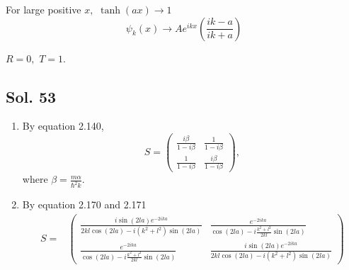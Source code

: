 \begin{enumerate}
    For large positive $x,$ $\operatorname{tanh}(ax)\to1$
    $$
    \psi_k(x)\to 
    Ae^{ikx}\left(
    \frac{ik-a}{ik+a}
    \right)
    $$

    $R=0,$ $T=1.$
    
\end{enumerate}

\subsection*{Sol. 53}

\begin{enumerate}
    \item By equation 2.140,
    $$
    S=\begin{pmatrix}
    \frac{i\beta}{1-i\beta}
    & 
    \frac{1}{1-i\beta}\\
    \frac{1}{1-i\beta} & 
    \frac{i\beta}{1-i\beta}
    \end{pmatrix},
    $$
    where $\beta=\frac{m\alpha}{\hbar^2k}.$
    \item 
    By equation 2.170 and 2.171
    \begin{align*}
        S=
        &\begin{pmatrix}
   \frac{
    i\sin(2la)
    e^{-2ika}}
    {2kl\cos(2la)-
    i(k^2+l^2)
    \sin(2la)
    }
    & 
    \frac{e^{-2ika}}
    {\cos(2la)-
    i\frac{k^2+l^2}{2kl}
    \sin(2la)
    }\\ 
    \frac{e^{-2ika}}
    {\cos(2la)-
    i\frac{k^2+l^2}{2kl}
    \sin(2la)
    }
    & 
    \frac{
    i\sin(2la)
    e^{-2ika}}
    {2kl\cos(2la)-
    i(k^2+l^2)
    \sin(2la)
    }
    \end{pmatrix}
    \end{align*}
\end{enumerate}

